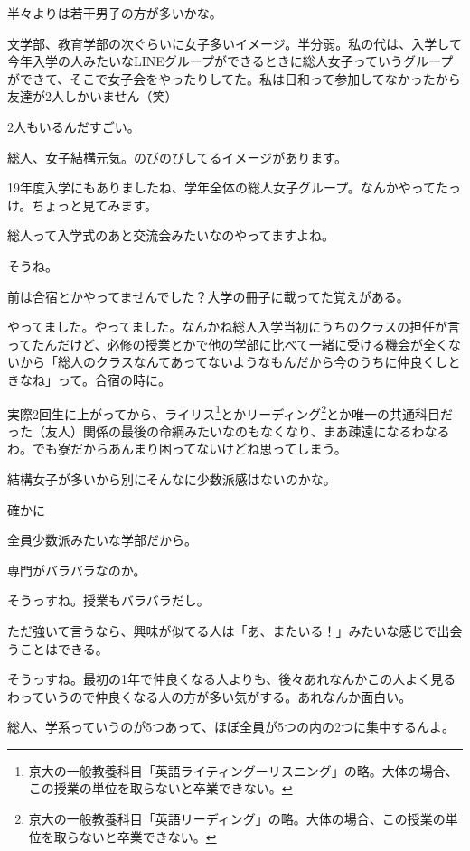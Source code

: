 \begin{multicols}{2}
  半々よりは若干男子の方が多いかな。

  文学部、教育学部の次ぐらいに女子多いイメージ。半分弱。私の代は、入学して今年入学の人みたいなLINEグループができるときに総人女子っていうグループができて、そこで女子会をやったりしてた。私は日和って参加してなかったから友達が2人しかいません（笑）

  2人もいるんだすごい。

  総人、女子結構元気。のびのびしてるイメージがあります。

  19年度入学にもありましたね、学年全体の総人女子グループ。なんかやってたっけ。ちょっと見てみます。

  総人って入学式のあと交流会みたいなのやってますよね。

  そうね。

  前は合宿とかやってませんでした？大学の冊子に載ってた覚えがある。

  やってました。やってました。なんかね総人入学当初にうちのクラスの担任が言ってたんだけど、必修の授業とかで他の学部に比べて一緒に受ける機会が全くないから「総人のクラスなんてあってないようなもんだから今のうちに仲良くしときなね」って。合宿の時に。

  実際2回生に上がってから、ライリス\footnote{京大の一般教養科目「英語ライティングーリスニング」の略。大体の場合、この授業の単位を取らないと卒業できない。}とかリーディング\footnote{京大の一般教養科目「英語リーディング」の略。大体の場合、この授業の単位を取らないと卒業できない。}とか唯一の共通科目だった（友人）関係の最後の命綱みたいなのもなくなり、まあ疎遠になるわなるわ。でも寮だからあんまり困ってないけどね思ってしまう。

  結構女子が多いから別にそんなに少数派感はないのかな。

  確かに

  全員少数派みたいな学部だから。

  専門がバラバラなのか。

  そうっすね。授業もバラバラだし。

  ただ強いて言うなら、興味が似てる人は「あ、またいる！」みたいな感じで出会うことはできる。

  そうっすね。最初の1年で仲良くなる人よりも、後々あれなんかこの人よく見るわっていうので仲良くなる人の方が多い気がする。あれなんか面白い。

  総人、学系っていうのが5つあって、ほぼ全員が5つの内の2つに集中するんよ。


\end{multicols}
